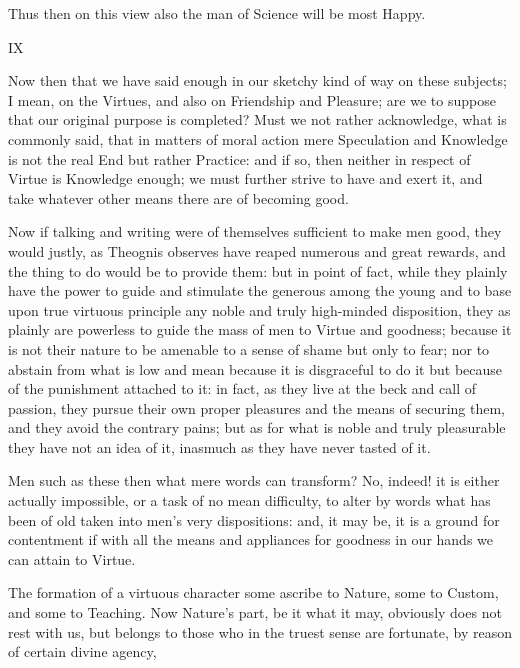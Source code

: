 Thus then on this view also the man of Science will be most Happy.



IX

Now then that we have said enough in our sketchy kind of way
on these subjects; I mean, on the Virtues, and also on Friendship and
Pleasure; are we to suppose that our original purpose is completed? Must
we not rather acknowledge, what is commonly said, that in matters of
moral action mere Speculation and Knowledge is not the real End but
rather Practice: and if so, then neither in respect of Virtue is
Knowledge enough; we must further strive to have and exert it, and take
whatever other means there are of becoming good.

Now if talking and writing were of themselves sufficient to make men
good, they would justly, as Theognis observes have reaped numerous and
great rewards, and the thing to do would be to provide them: but in
point of fact, while they plainly have the power to guide and stimulate
the generous among the young and to base upon true virtuous principle
any noble and truly high-minded disposition, they as plainly are
powerless to guide the mass of men to Virtue and goodness; because it is
not their nature to be amenable to a sense of shame but only to fear;
nor to abstain from what is low and mean because it is disgraceful to do
it but because of the punishment attached to it: in fact, as they live
at the beck and call of passion, they pursue their own proper pleasures
and the means of securing them, and they avoid the contrary pains; but
as for what is noble and truly pleasurable they have not an idea of it,
inasmuch as they have never tasted of it.

Men such as these then what mere words can transform? No, indeed! it is
either actually impossible, or a task of no mean difficulty, to alter by
words what has been of old taken into men's very dispositions: and,
it may be, it is a ground for contentment if with all the means and
appliances for goodness in our hands we can attain to Virtue.

The formation of a virtuous character some ascribe to Nature, some to
Custom, and some to Teaching. Now Nature's part, be it what it may,
obviously does not rest with us, but belongs to those who in the truest
sense are fortunate, by reason of certain divine agency,

